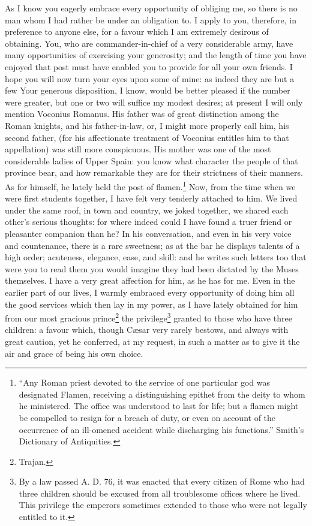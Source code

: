 
As I know you eagerly embrace every opportunity of obliging me, so there
is no man whom I had rather be under an obligation to. I apply to you,
therefore, in preference to anyone else, for a favour which I am extremely
desirous of obtaining. You, who are commander-in-chief of a very
considerable army, have many opportunities of exercising your generosity;
and the length of time you have enjoyed that post must have enabled you to
provide for all your own friends. I hope you will now turn your eyes upon
some of mine: as indeed they are but a few Your generous disposition, I
know, would be better pleased if the number were greater, but one or two
will suffice my modest desires; at present I will only mention Voconius
Romanus. His father was of great distinction among the Roman knights, and
his father-in-law, or, I might more properly call him, his second father,
(for his affectionate treatment of Voconius entitles him to that
appellation) was still more conspicuous. His mother was one of the most
considerable ladies of Upper Spain: you know what character the people of
that province bear, and how remarkable they are for their strictness of
their manners. As for himself, he lately held the post of flamen.\footnote{``Any Roman priest devoted
to the service of one particular god was designated Flamen, receiving a
distinguishing epithet from the deity to whom he ministered. The office
was understood to last for life; but a flamen might be compelled to resign
for a breach of duty, or even on account of the occurrence of an
ill-omened accident while discharging his functions.'' Smith's Dictionary
of Antiquities.}
Now, from the time when we were first students together, I have felt very
tenderly attached to him. We lived under the same roof, in town and
country, we joked together, we shared each other's serious thoughts: for
where indeed could I have found a truer friend or pleasanter companion
than he? In his conversation, and even in his very voice and countenance,
there is a rare sweetness; as at the bar he displays talents of a high
order; acuteness, elegance, ease, and skill: and he writes such letters
too that were you to read them you would imagine they had been dictated by
the Muses themselves. I have a very great affection for him, as he has for
me. Even in the earlier part of our lives, I warmly embraced every
opportunity of doing him all the good services which then lay in my power,
as I have lately obtained for him from our most gracious prince\footnote{Trajan.} the
privilege\footnote{By a law passed A. D.
76, it was enacted that every citizen of Rome who had three children
should be excused from all troublesome offices where he lived. This
privilege the emperors sometimes extended to those who were not legally
entitled to it.}
granted to those who have three children: a favour which, though Cæsar
very rarely bestows, and always with great caution, yet he conferred, at
my request, in such a matter as to give it the air and grace of being his
own choice.

